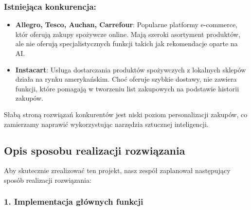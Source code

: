 \documentclass[12pt,a4paper]{article}
\begin{document}
\subsubsection*{Istniejąca konkurencja:}
\begin{itemize}
    \item \textbf{Allegro, Tesco, Auchan, Carrefour}: Popularne platformy e-commerce, któr
        oferują zakupy spożywcze online. Mają szeroki asortyment produktów, ale nie oferują
        specjalistycznych funkcji takich jak rekomendacje oparte na AI.
    \item \textbf{Instacart}: Usługa dostarczania produktów spożywczych z lokalnych sklepów
        działa na rynku amerykańskim. Choć oferuje szybkie dostawy, nie zawiera funkcji, które
        pomagają w tworzeniu list zakupowych na podstawie historii zakupów.
\end{itemize}

Słabą stroną rozwiązań konkurentów jest niski poziom personalizacji zakupów, co zamierzamy naprawić
wykorzystując narzędzia sztucznej inteligencji.

\subsection*{Opis sposobu realizacji rozwiązania}

Aby skutecznie zrealizować ten projekt, nasz zespół zaplanował następujący sposób realizacji
rozwiązania:


\subsubsection*{1. Implementacja głównych funkcji}
\end{document}
